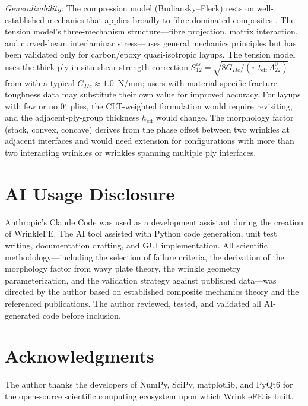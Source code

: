 \documentclass[10pt,a4paper]{article}
\begin{document}
\textit{Generalizability:}
The compression model (Budiansky--Fleck) rests on well-established mechanics that applies broadly to fibre-dominated composites \citep{Fleck1997}.
The tension model's three-mechanism structure---fibre projection, matrix interaction, and curved-beam interlaminar stress---uses general mechanics principles but has been validated only for carbon/epoxy quasi-isotropic layups.
The tension model uses the thick-ply in-situ shear strength correction $S_{12}^{is} = \sqrt{8G_{IIc}/(\pi\,t_{\text{eff}}\,\Lambda_{22}^0)}$ from \citet{Camanho2006} with a typical $G_{IIc} \approx 1.0$~N/mm; users with material-specific fracture toughness data may substitute their own value for improved accuracy.
For layups with few or no 0$^\circ$ plies, the CLT-weighted formulation would require revisiting, and the adjacent-ply-group thickness $h_{\text{eff}}$ would change.
The morphology factor (stack, convex, concave) derives from the phase offset between two wrinkles at adjacent interfaces and would need extension for configurations with more than two interacting wrinkles or wrinkles spanning multiple ply interfaces.

\section*{AI Usage Disclosure}

Anthropic's Claude Code was used as a development assistant during the creation of WrinkleFE.
The AI tool assisted with Python code generation, unit test writing, documentation drafting, and GUI implementation.
All scientific methodology---including the selection of failure criteria, the derivation of the morphology factor from wavy plate theory, the wrinkle geometry parameterization, and the validation strategy against published data---was directed by the author based on established composite mechanics theory and the referenced publications.
The author reviewed, tested, and validated all AI-generated code before inclusion.

\section*{Acknowledgments}

The author thanks the developers of NumPy, SciPy, matplotlib, and PyQt6 for the open-source scientific computing ecosystem upon which WrinkleFE is built.



\end{document}
